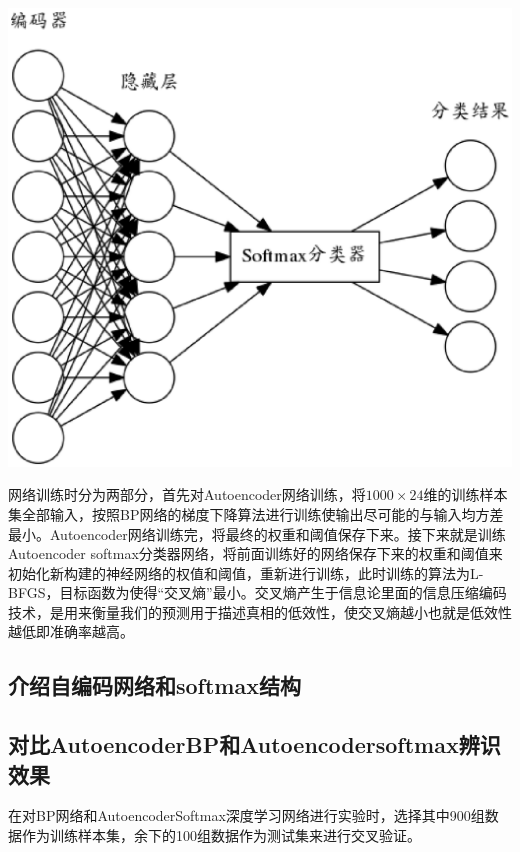 \documentclass{ctacn}%
\begin{document}
\begin{multicols}{2}
\begin{center}
	\includegraphics[scale=0.45, trim=0 0 0 0]{figs/autoencoder_softmax}\\
	\label{fig4}
\end{center}

网络训练时分为两部分，首先对Autoencoder网络训练，将$1000\times24$维的训练样本集全部输入，按照BP网络的梯度下降算法进行训练使输出尽可能的与输入均方差最小。Autoencoder网络训练完，将最终的权重和阈值保存下来。接下来就是训练Autoencoder
softmax分类器网络，将前面训练好的网络保存下来的权重和阈值来初始化新构建的神经网络的权值和阈值，重新进行训练，此时训练的算法为L-BFGS，目标函数为使得``交叉熵''最小。交叉熵产生于信息论里面的信息压缩编码技术，是用来衡量我们的预测用于描述真相的低效性，使交叉熵越小也就是低效性越低即准确率越高。

\subsection{介绍自编码网络和softmax结构}

\subsection{对比AutoencoderBP和Autoencodersoftmax辨识效果}

在对BP网络和AutoencoderSoftmax深度学习网络进行实验时，选择其中900组数据作为训练样本集，余下的100组数据作为测试集来进行交叉验证。


\end{multicols}
\end{document}
